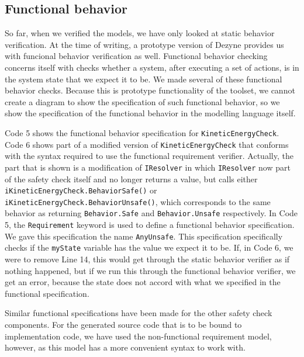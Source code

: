 \documentclass[12pt]{scrreprt}
\begin{document}
\subsection{Functional behavior}
So far, when we verified the models, we have only looked at static behavior verification. At the time of writing, a prototype version of Dezyne provides us with funcional behavior verification as well. Functional behavior checking concerns itself with checks whether a system, after executing a set of actions, is in the system state that we expect it to be. We made several of these functional behavior checks. Because this is prototype functionality of the toolset, we cannot create a diagram to show the specification of such functional behavior, so we show the specification of the functional behavior in the modelling language itself.
\par
Code 5 shows the functional behavior specification for \texttt{KineticEnergyCheck}. Code 6 shows part of a modified version of \texttt{KineticEnergyCheck} that conforms with the syntax required to use the functional requirement verifier. Actually, the part that is shown is a modification of \texttt{IResolver} in which \texttt{IResolver} now part of the safety check itself and no longer returns a value, but calls either \texttt{iKineticEnergyCheck.BehaviorSafe()} or \texttt{iKineticEnergyCheck.BehaviorUnsafe()}, which corresponds to the same behavior as returning \texttt{Behavior.Safe} and \texttt{Behavior.Unsafe} respectively. In Code 5, the \texttt{Requirement} keyword is used to define a functional behavior specification. We gave this specification the name \texttt{AnyUnsafe}. This specification specifically checks if the \texttt{myState} variable has the value we expect it to be. If, in Code 6, we were to remove Line 14, this would get through the static behavior verifier as if nothing happened, but if we run this through the functional behavior verifier, we get an error, because the state does not accord with what we specified in the functional specification.


Similar functional specifications have been made for the other safety check components. For the generated source code that is to be bound to implementation code, we have used the non-functional requirement model, however, as this model has a more convenient syntax to work with.
\end{document}
